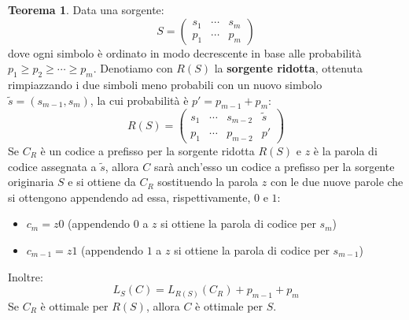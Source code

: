 \documentclass{article}
\theoremstyle{definition}
\newtheorem{theorem}{Teorema}[section] %
\numberwithin{equation}{section}
\begin{document}
\begin{theorem}
    Data una sorgente:
    \[
        S=
        \begin{pmatrix}
            s_1 & \cdots & s_m \\
            p_1 & \cdots & p_m
        \end{pmatrix}
    \]
    dove ogni simbolo è ordinato in modo decrescente in base alle probabilità $p_1 \geq p_2 \geq \cdots \geq p_m$. Denotiamo con $R(S)$ la \textbf{sorgente ridotta}, ottenuta rimpiazzando i due simboli meno probabili con un nuovo simbolo $\tilde{s}=(s_{m-1}, s_m)$, la cui probabilità è $p' = p_{m-1} + p_m$:
    \[
        R(S) =
        \begin{pmatrix}
            s_1 & \cdots & s_{m-2} & \tilde{s} \\
            p_1 & \cdots & p_{m-2} & p'
        \end{pmatrix}
    \]
    Se $C_R$ è un codice a prefisso per la sorgente ridotta $R(S)$ e $z$ è la parola di codice assegnata a $\tilde{s}$, allora $C$ sarà anch'esso un codice a prefisso per la sorgente originaria $S$ e si ottiene da $C_R$ sostituendo la parola $z$ con le due nuove parole che si ottengono appendendo ad essa, rispettivamente, $0$ e $1$:
    \begin{itemize}
        \item $c_m = z0$ (appendendo $0$ a $z$ si ottiene la parola di codice per $s_m$)
        \item $c_{m-1} = z1$ (appendendo $1$ a $z$ si ottiene la parola di codice per $s_{m-1}$)
    \end{itemize}
    Inoltre:
    \[
        L_S(C)=L_{R(S)}(C_R)+p_{m-1}+p_m
    \]
    Se $C_R$ è ottimale per $R(S)$, allora $C$ è ottimale per $S$.
\end{theorem}
\end{document}
